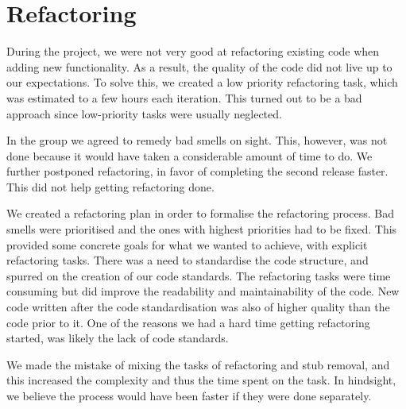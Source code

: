 \section{Refactoring}
During the project, we were not very good at refactoring existing code when adding new functionality. As a result, the quality of the code did not live up to our expectations. To solve this, we created a low priority refactoring task, which was estimated to a few hours each iteration. This turned out to be a bad approach since low-priority tasks were usually neglected. 

In the group we agreed to remedy bad smells on sight. This, however, was not done because it would have taken a considerable amount of time to do. We further postponed refactoring, in favor of completing the second release faster. This did not help getting refactoring done.

We created a refactoring plan in order to formalise the refactoring process. Bad smells were prioritised and the ones with highest priorities had to be fixed. This provided some concrete goals for what we wanted to achieve, with explicit refactoring tasks. There was a need to standardise the code structure, and spurred on the creation of our code standards. The refactoring tasks were time consuming but did improve the readability and maintainability of the code. New code written after the code standardisation was also of higher quality than the code prior to it. One of the reasons we had a hard time getting refactoring started, was likely the lack of code standards.

We made the mistake of mixing the tasks of refactoring and stub removal, and this  increased the complexity and thus the time spent on the task. In hindsight, we believe the process would have been faster if they were done separately.